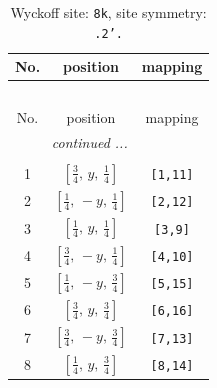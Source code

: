 \documentclass[fleqn,8pt]{jsarticle}
\begin{document}
\begin{longtable}{ccc}
\caption{Wyckoff site: {\tt 8k}, site symmetry: {\tt .2'.}}
 \\
 \hline \hline
No. & position & mapping \\ \hline \endfirsthead

\multicolumn{2}{l}{\tablename\ \thetable{}} \\
 \hline \hline
No. & position & mapping \\ \hline \endhead

 \hline \hline
\multicolumn{2}{r}{\footnotesize\it continued ...} \\ \endfoot

 \hline \hline
\multicolumn{2}{r}{} \\ \endlastfoot

1 & $\left[ \frac{3}{4},\, y,\, \frac{1}{4} \right]$ & {\tt [1,11]} \\ \hline
2 & $\left[ \frac{1}{4},\, - y,\, \frac{1}{4} \right]$ & {\tt [2,12]} \\ \hline
3 & $\left[ \frac{1}{4},\, y,\, \frac{1}{4} \right]$ & {\tt [3,9]} \\ \hline
4 & $\left[ \frac{3}{4},\, - y,\, \frac{1}{4} \right]$ & {\tt [4,10]} \\ \hline
5 & $\left[ \frac{1}{4},\, - y,\, \frac{3}{4} \right]$ & {\tt [5,15]} \\ \hline
6 & $\left[ \frac{3}{4},\, y,\, \frac{3}{4} \right]$ & {\tt [6,16]} \\ \hline
7 & $\left[ \frac{3}{4},\, - y,\, \frac{3}{4} \right]$ & {\tt [7,13]} \\ \hline
8 & $\left[ \frac{1}{4},\, y,\, \frac{3}{4} \right]$ & {\tt [8,14]} \\
\end{longtable}
\renewcommand{\arraystretch}{1.2}
\end{document}
